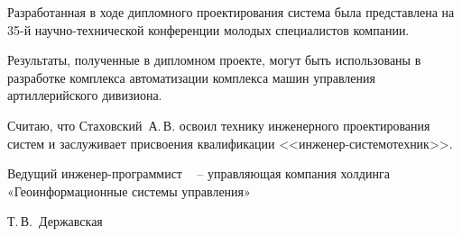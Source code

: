 {%


	Разработанная в ходе дипломного проектирования система была представлена на
	35-й научно-технической конференции молодых специалистов компании.

Результаты, полученные в дипломном проекте, могут быть использованы в разработке комплекса автоматизации комплекса
	машин управления артиллерийского дивизиона.


Считаю, что Стаховский~А.\,В. освоил технику инженерного проектирования систем
	и заслуживает присвоения квалификации <<инженер-\break системотехник>>.


	\bigskip
	\bigskip
  \noindent
  \begin{minipage}{0.54\textwidth}
    \begin{flushleft}
	    Ведущий инженер-программист \company~ -- управляющая компания
	    холдинга «Геоинформационные системы управления»
    \end{flushleft}
  \end{minipage}
  \begin{minipage}{0.44\textwidth}
    \begin{flushright}
       Т.\,В.~Державская
    \end{flushright}
  \end{minipage}
}


\clearpage
